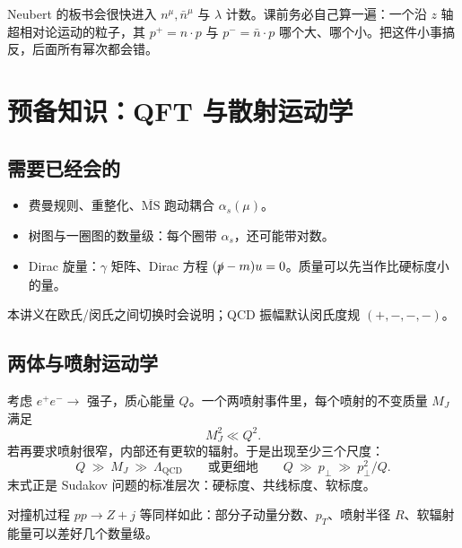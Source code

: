 \documentclass[11pt,a4paper]{article}
\theoremstyle{definition}
\theoremstyle{plain}
\theoremstyle{remark}
\begin{document}
\begin{hearbox}
Neubert 的板书会很快进入 $n^\mu,\bar n^\mu$ 与 $\lambda$ 计数。课前务必自己算一遍：一个沿 $z$ 轴超相对论运动的粒子，其 $p^+=n\cdot p$ 与 $p^-=\bar n\cdot p$ 哪个大、哪个小。把这件小事搞反，后面所有幂次都会错。
\end{hearbox}

\section{预备知识：QFT 与散射运动学}
\label{sec:prereq}

\subsection{需要已经会的}

\begin{itemize}[leftmargin=1.4em]
  \item 费曼规则、重整化、$\overline{\mathrm{MS}}$ 跑动耦合 $\alpha_s(\mu)$。
  \item 树图与一圈图的数量级：每个圈带 $\alpha_s$，还可能带对数。
  \item Dirac 旋量：$\gamma$ 矩阵、Dirac 方程 $(\slashed{p}-m)u=0$。质量可以先当作比硬标度小的量。
\end{itemize}

本讲义在欧氏/闵氏之间切换时会说明；QCD 振幅默认闵氏度规 $(+,-,-,-)$。

\subsection{两体与喷射运动学}

考虑 $e^+e^-\to$ 强子，质心能量 $Q$。一个两喷射事件里，每个喷射的不变质量 $M_J$ 满足
\begin{equation}
  M_J^2\ll Q^2.
\end{equation}
若再要求喷射很窄，内部还有更软的辐射。于是出现至少三个尺度：
\begin{equation}
\label{eq:scales}
  Q\ \gg\ M_J\ \gg\ \Lambda_{\mathrm{QCD}}
  \qquad\text{或更细地}\qquad
  Q\ \gg\ p_\perp\ \gg\ p_\perp^2/Q.
\end{equation}
末式正是 Sudakov 问题的标准层次：硬标度、共线标度、软标度。

对撞机过程 $pp\to Z+j$ 等同样如此：部分子动量分数、$p_T$、喷射半径 $R$、软辐射能量可以差好几个数量级。
\end{document}

